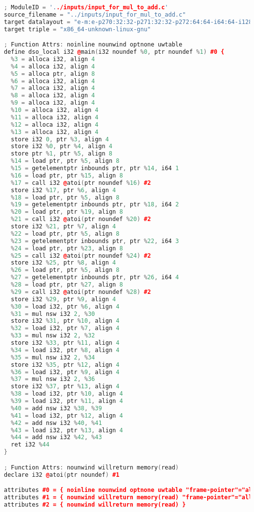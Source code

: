 \documentclass[16pt]{article}
\begin{document}
\vspace{2.5pt}
\begin{lstlisting}[caption=Initial IR File, label=input_for_mul_to_add.ll,
style=chstyle,language=C++]
; ModuleID = '../inputs/input_for_mul_to_add.c'
source_filename = "../inputs/input_for_mul_to_add.c"
target datalayout = "e-m:e-p270:32:32-p271:32:32-p272:64:64-i64:64-i128:128-f80:128-n8:16:32:64-S128"
target triple = "x86_64-unknown-linux-gnu"

; Function Attrs: noinline nounwind optnone uwtable
define dso_local i32 @main(i32 noundef %0, ptr noundef %1) #0 {
  %3 = alloca i32, align 4
  %4 = alloca i32, align 4
  %5 = alloca ptr, align 8
  %6 = alloca i32, align 4
  %7 = alloca i32, align 4
  %8 = alloca i32, align 4
  %9 = alloca i32, align 4
  %10 = alloca i32, align 4
  %11 = alloca i32, align 4
  %12 = alloca i32, align 4
  %13 = alloca i32, align 4
  store i32 0, ptr %3, align 4
  store i32 %0, ptr %4, align 4
  store ptr %1, ptr %5, align 8
  %14 = load ptr, ptr %5, align 8
  %15 = getelementptr inbounds ptr, ptr %14, i64 1
  %16 = load ptr, ptr %15, align 8
  %17 = call i32 @atoi(ptr noundef %16) #2
  store i32 %17, ptr %6, align 4
  %18 = load ptr, ptr %5, align 8
  %19 = getelementptr inbounds ptr, ptr %18, i64 2
  %20 = load ptr, ptr %19, align 8
  %21 = call i32 @atoi(ptr noundef %20) #2
  store i32 %21, ptr %7, align 4
  %22 = load ptr, ptr %5, align 8
  %23 = getelementptr inbounds ptr, ptr %22, i64 3
  %24 = load ptr, ptr %23, align 8
  %25 = call i32 @atoi(ptr noundef %24) #2
  store i32 %25, ptr %8, align 4
  %26 = load ptr, ptr %5, align 8
  %27 = getelementptr inbounds ptr, ptr %26, i64 4
  %28 = load ptr, ptr %27, align 8
  %29 = call i32 @atoi(ptr noundef %28) #2
  store i32 %29, ptr %9, align 4
  %30 = load i32, ptr %6, align 4
  %31 = mul nsw i32 2, %30
  store i32 %31, ptr %10, align 4
  %32 = load i32, ptr %7, align 4
  %33 = mul nsw i32 2, %32
  store i32 %33, ptr %11, align 4
  %34 = load i32, ptr %8, align 4
  %35 = mul nsw i32 2, %34
  store i32 %35, ptr %12, align 4
  %36 = load i32, ptr %9, align 4
  %37 = mul nsw i32 2, %36
  store i32 %37, ptr %13, align 4
  %38 = load i32, ptr %10, align 4
  %39 = load i32, ptr %11, align 4
  %40 = add nsw i32 %38, %39
  %41 = load i32, ptr %12, align 4
  %42 = add nsw i32 %40, %41
  %43 = load i32, ptr %13, align 4
  %44 = add nsw i32 %42, %43
  ret i32 %44
}

; Function Attrs: nounwind willreturn memory(read)
declare i32 @atoi(ptr noundef) #1

attributes #0 = { noinline nounwind optnone uwtable "frame-pointer"="all" "min-legal-vector-width"="0" "no-trapping-math"="true" "stack-protector-buffer-size"="8" "target-cpu"="x86-64" "target-features"="+cmov,+cx8,+fxsr,+mmx,+sse,+sse2,+x87" "tune-cpu"="generic" }
attributes #1 = { nounwind willreturn memory(read) "frame-pointer"="all" "no-trapping-math"="true" "stack-protector-buffer-size"="8" "target-cpu"="x86-64" "target-features"="+cmov,+cx8,+fxsr,+mmx,+sse,+sse2,+x87" "tune-cpu"="generic" }
attributes #2 = { nounwind willreturn memory(read) }


\end{lstlisting}
\end{document}
